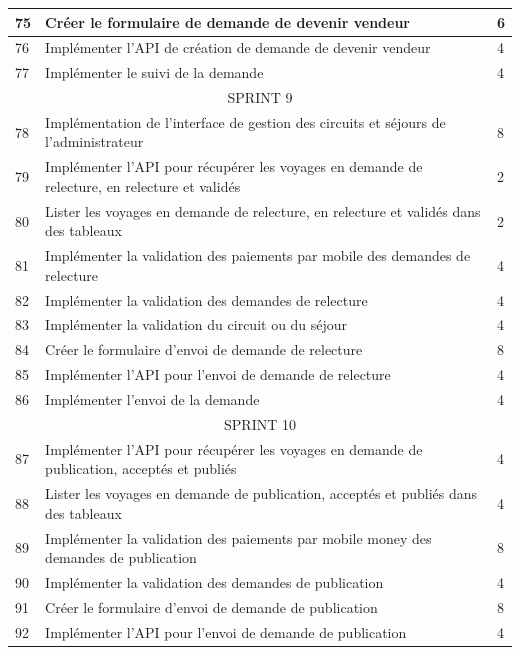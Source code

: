 \documentclass[12pt]{report}
\begin{document}
\begin{longtable}{|p{1cm}|p{7cm}|p{6cm}|}
						75 & Créer le formulaire de demande de devenir vendeur & 6\\
						\hline
						76 & Implémenter l'API de création de demande de devenir vendeur & 4\\
						\hline
						77 & Implémenter le suivi de la demande & 4\\
						\hline
						\multicolumn{3}{|c|}{SPRINT 9}\\
						\hline
						78 & Implémentation de l'interface de gestion des circuits et séjours de l'administrateur & 8\\
						\hline
						79 & Implémenter l'API pour récupérer les voyages en demande de relecture, en relecture et validés & 2\\
						\hline
						80 & Lister les voyages en demande de relecture, en relecture et validés dans des tableaux & 2\\
						\hline
						81 & Implémenter la validation des paiements par mobile des demandes de relecture & 4\\
						\hline
						82 & Implémenter la validation des demandes de relecture & 4\\
						\hline
						83 & Implémenter la validation du circuit ou du séjour & 4\\
						\hline
						84 & Créer le formulaire d'envoi de demande de relecture & 8\\
						\hline
						85 & Implémenter l'API pour l'envoi de demande de relecture & 4\\
						\hline
						86 & Implémenter l'envoi de la demande & 4\\
						\hline
						\multicolumn{3}{|c|}{SPRINT 10}\\
						\hline
						87 & Implémenter l'API pour récupérer les voyages en demande de publication, acceptés et publiés & 4\\
						\hline
						88 & Lister les voyages en demande de publication, acceptés et publiés dans des tableaux & 4\\
						\hline
						89 & Implémenter la validation des paiements par mobile money des demandes de publication & 8\\
						\hline
						90 & Implémenter la validation des demandes de publication & 4\\
						\hline
						91 & Créer le formulaire d'envoi de demande de publication & 8\\
						\hline
						92 & Implémenter l'API pour l'envoi de demande de publication & 4\\
						\hline

\end{longtable}
\end{document}
